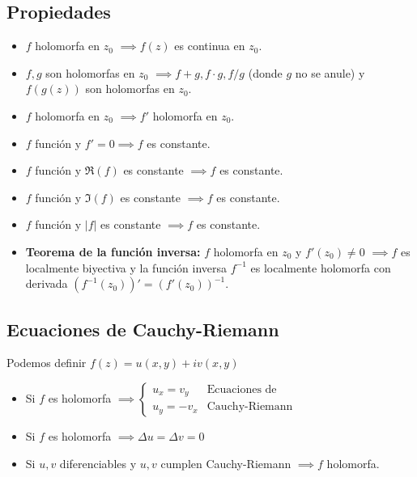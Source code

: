 \documentclass[paper=a4, fontsize=11pt]{scrartcl}
\numberwithin{equation}{section}
\numberwithin{figure}{section}
\numberwithin{table}{section}
\begin{document}
\subsection{Propiedades}
\begin{itemize}
\item $f$ holomorfa en $z_0$ $\implies f(z)$ es continua en $z_0$.
\item $f,g$ son holomorfas en $z_0$ $\implies f+g,f\cdot g, f/g$ (donde $g$ no se anule) y $f(g(z))$ son holomorfas en $z_0$.
\item $f$ holomorfa en $z_0$ $\implies f'$ holomorfa en $z_0$.
\item $f$ función y $f'=0\implies f$ es constante.
\item $f$ función y $\Re( f)$ es constante $\implies f$ es constante.
\item $f$ función y $\Im( f)$ es constante $\implies f$ es constante.
\item $f$ función y $|f|$ es constante $\implies f$ es constante.
\item \textbf{Teorema de la función inversa:} $f$ holomorfa en $z_0$ y $f'(z_0)\neq 0$ $\implies f$ es localmente biyectiva y la función inversa $f^{-1}$ es localmente holomorfa con derivada $(f^{-1}(z_0))' = (f'(z_0))^{-1}$.
\end{itemize}

\subsection{Ecuaciones de Cauchy-Riemann}
Podemos definir $f(z) = u(x,y)+iv(x,y)$
\begin{itemize}
\item Si $f$ es holomorfa $\implies \boxed{
\left\{
\begin{array}{ll}
u_x=v_y&\text{Ecuaciones de}\\
u_y=-v_x&\text{Cauchy-Riemann}
\end{array}
\right.}$
\item Si $f$ es holomorfa $\implies \Delta u=\Delta v = 0$
\item Si $u, v$ diferenciables y $u,v$ cumplen Cauchy-Riemann $\implies f$ holomorfa.
\end{itemize}
\end{document}
